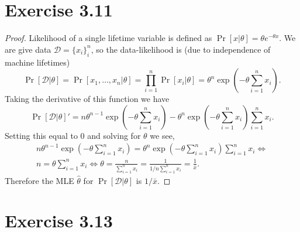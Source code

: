 \documentclass[12pt]{article}
\newcommand{\D}{\mathcal{D}}
\begin{document}
\section*{Exercise 3.11}
\begin{proof}
Likelihood of a single lifetime variable is defined as $\Pr[x | \theta] = \theta e^{-\theta x}.$
We are give data $\D = \{x_i\}_i^n$, so the data-likelihood is (due to
independence of machine lifetimes)
\[\Pr[\D|\theta] = \Pr[x_1, \dotsc, x_n|\theta] = \prod_{i=1}^n \Pr[x_i | \theta] =
    \theta^n \exp(-\theta \sum_{i=1}^n x_i).\]
Taking the derivative of this function we have
\[\Pr[\D|\theta]' = n \theta^{n - 1}\exp(-\theta \sum_{i=1}^n x_i)
    - \theta^n \exp(-\theta \sum_{i=1}^n x_i) \sum_{i=1}^n x_i.\]
Setting this equal to 0 and solving for $\theta$ we see,
\begin{align*}
    n \theta^{n - 1}\exp(-\theta \sum_{i=1}^n x_i) = 
        \theta^n \exp(-\theta \sum_{i=1}^n x_i) \sum_{i=1}^n x_i \iff\\
    n = \theta \sum_{i=1}^n x_i \iff \theta =
        \frac{n}{\sum_{i=1}^n x_i} = \frac{1}{1/n \sum_{i=1}^n x_i} = \frac{1}{\bar{x}}.
\end{align*}
Therefore the MLE $\hat{\theta}$ for $\Pr[\D|\theta]$ is $1/\bar{x}.$
\end{proof}
\section*{Exercise 3.13}
\end{document}
